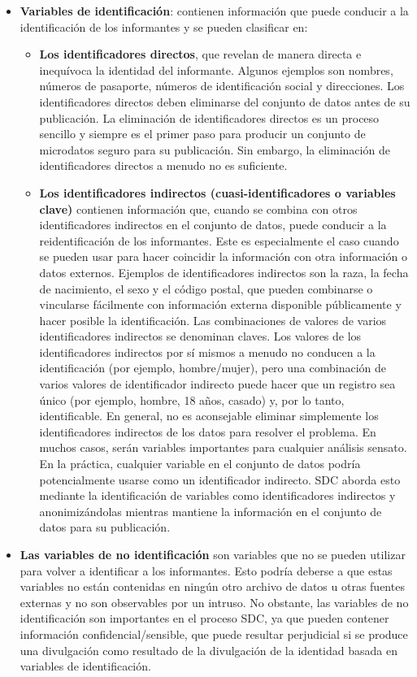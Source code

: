 \documentclass[]{book}
\theoremstyle{definition}
\theoremstyle{definition}
\theoremstyle{definition}
\theoremstyle{definition}
\theoremstyle{remark}
\begin{document}
\begin{itemize}
\item
  \textbf{Variables de identificación}: contienen información que puede conducir a la identificación de los informantes y se pueden clasificar en:

  \begin{itemize}
  \item
    \textbf{Los identificadores directos}, que revelan de manera directa e inequívoca la identidad del informante. Algunos ejemplos son nombres, números de pasaporte, números de identificación social y direcciones. Los identificadores directos deben eliminarse del conjunto de datos antes de su publicación. La eliminación de identificadores directos es un proceso sencillo y siempre es el primer paso para producir un conjunto de microdatos seguro para su publicación. Sin embargo, la eliminación de identificadores directos a menudo no es suficiente.
  \item
    \textbf{Los identificadores indirectos (cuasi-identificadores o variables clave)} contienen información que, cuando se combina con otros identificadores indirectos en el conjunto de datos, puede conducir a la reidentificación de los informantes. Este es especialmente el caso cuando se pueden usar para hacer coincidir la información con otra información o datos externos. Ejemplos de identificadores indirectos son la raza, la fecha de nacimiento, el sexo y el código postal, que pueden combinarse o vincularse fácilmente con información externa disponible públicamente y hacer posible la identificación. Las combinaciones de valores de varios identificadores indirectos se denominan claves. Los valores de los identificadores indirectos por sí mismos a menudo no conducen a la identificación (por ejemplo, hombre/mujer), pero una combinación de varios valores de identificador indirecto puede hacer que un registro sea único (por ejemplo, hombre, 18 años, casado) y, por lo tanto, identificable. En general, no es aconsejable eliminar simplemente los identificadores indirectos de los datos para resolver el problema. En muchos casos, serán variables importantes para cualquier análisis sensato. En la práctica, cualquier variable en el conjunto de datos podría potencialmente usarse como un identificador indirecto. SDC aborda esto mediante la identificación de variables como identificadores indirectos y anonimizándolas mientras mantiene la información en el conjunto de datos para su publicación.
  \end{itemize}
\item
  \textbf{Las variables de no identificación} son variables que no se pueden utilizar para volver a identificar a los informantes. Esto podría deberse a que estas variables no están contenidas en ningún otro archivo de datos u otras fuentes externas y no son observables por un intruso. No obstante, las variables de no identificación son importantes en el proceso SDC, ya que pueden contener información confidencial/sensible, que puede resultar perjudicial si se produce una divulgación como resultado de la divulgación de la identidad basada en variables de identificación.
\end{itemize}
\end{document}
